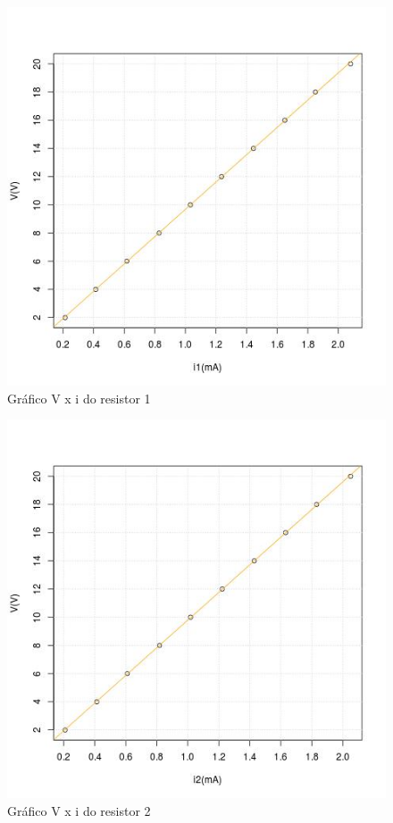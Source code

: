 \documentclass[11pt,a4paper]{article}
\begin{document}
    \begin{figure}[htb!]
      \centering
      \captionsetup{justification=centering}  
      \includegraphics[scale=0.7]{Vi1}
      \caption{Gráfico V x i do resistor 1}
      \label{fig:i1}
    \end{figure}
    
    \begin{figure}[htb!]
      \centering
      \captionsetup{justification=centering}  
      \includegraphics[scale=0.7]{Vi2}
      \caption{Gráfico V x i do resistor 2}
      \label{fig:i2}
    \end{figure}
    
\end{document}
